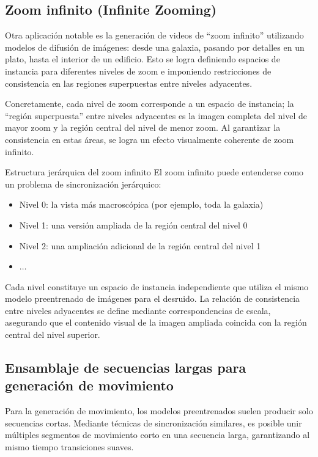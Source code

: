 \subsection{Zoom infinito (Infinite Zooming)}

Otra aplicación notable es la generación de videos de ``zoom infinito'' utilizando modelos de difusión de imágenes: desde una galaxia, pasando por detalles en un plato, hasta el interior de un edificio. Esto se logra definiendo espacios de instancia para diferentes niveles de zoom e imponiendo restricciones de consistencia en las regiones superpuestas entre niveles adyacentes.

Concretamente, cada nivel de zoom corresponde a un espacio de instancia; la ``región superpuesta'' entre niveles adyacentes es la imagen completa del nivel de mayor zoom y la región central del nivel de menor zoom. Al garantizar la consistencia en estas áreas, se logra un efecto visualmente coherente de zoom infinito.

\begin{knowledgebox}{Estructura jerárquica del zoom infinito}
El zoom infinito puede entenderse como un problema de sincronización jerárquico:
\begin{itemize}
    \item Nivel 0: la vista más macroscópica (por ejemplo, toda la galaxia)
    \item Nivel 1: una versión ampliada de la región central del nivel 0
    \item Nivel 2: una ampliación adicional de la región central del nivel 1
    \item $\ldots$
\end{itemize}
Cada nivel constituye un espacio de instancia independiente que utiliza el mismo modelo preentrenado de imágenes para el desruido. La relación de consistencia entre niveles adyacentes se define mediante correspondencias de escala, asegurando que el contenido visual de la imagen ampliada coincida con la región central del nivel superior.
\end{knowledgebox}

\subsection{Ensamblaje de secuencias largas para generación de movimiento}

Para la generación de movimiento, los modelos preentrenados suelen producir solo secuencias cortas. Mediante técnicas de sincronización similares, es posible unir múltiples segmentos de movimiento corto en una secuencia larga, garantizando al mismo tiempo transiciones suaves.

